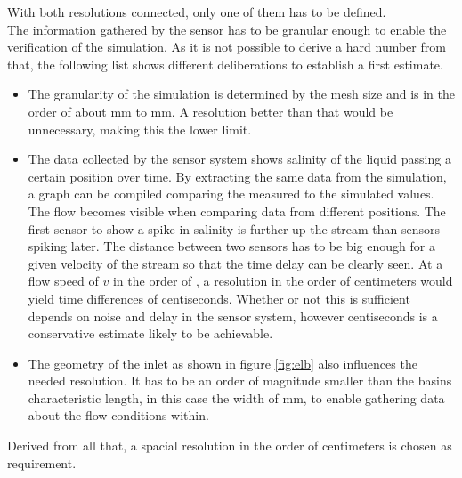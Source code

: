 With both resolutions connected, only one of them has to be defined. \\

The information gathered by the sensor has to be granular enough to enable the verification of the simulation. As it is not possible to derive a hard number from that, the following list shows different deliberations to establish a first estimate. \\

\begin{itemize}
\item The granularity of the simulation is determined by the mesh size and is in the order of about  \unit[1]{mm} to \unit[5]{mm}. A resolution better than that would be unnecessary, making this the lower limit.

\item The data collected by the sensor system shows salinity of the liquid passing a certain position over time. By extracting the same data from the simulation, a graph can be compiled comparing the measured to the simulated values. The flow becomes visible when comparing data from different positions. The first sensor to show a spike in salinity is further up the stream than sensors spiking later. The distance between two sensors has to be big enough for a given velocity of the stream so that the time delay can be clearly seen. At a flow speed of $ v $ in the order of , a resolution in the order of centimeters would yield time differences of centiseconds. Whether or not this is sufficient depends on noise and delay in the sensor system, however centiseconds is a conservative estimate likely to be achievable.

\item The geometry of the inlet as shown in figure \ref{fig:elb} also influences the needed resolution. It has to be an order of magnitude smaller than the basins characteristic length, in this case the width of \unit[850]{mm}, to enable gathering data about the flow conditions within.
\end{itemize}

Derived from all that, a spacial resolution in the order of centimeters is chosen as requirement.

